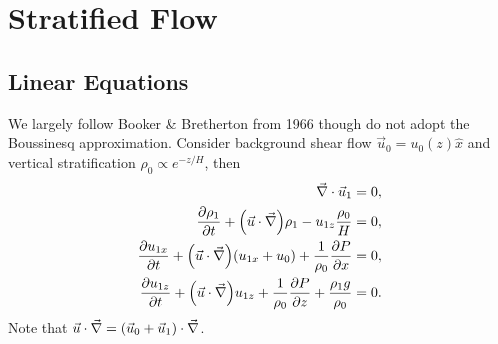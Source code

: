 \documentclass[11pt,
        usenames, %
        dvipsnames %
    ]{report}
\newcommand*{\pd}[2]{\frac{\partial#1}{\partial#2}}
\DeclarePairedDelimiter\p{\lparen}{\rparen}
\begin{document}
\chapter{Stratified Flow}

\section{Linear Equations}

We largely follow Booker \& Bretherton from 1966 though do not adopt the
Boussinesq approximation. Consider background shear flow $\vec{u}_0 =
u_0(z)\hat{x}$ and vertical stratification $\rho_0 \propto e^{-z/H}$, then
\begin{subequations}\label{se:shear_eq}
    \begin{align}
        \vec{\nabla} \cdot \vec{u}_1 &= 0,\\
        \pd{\rho_1}{t} + \p*{\vec{u} \cdot \vec{\nabla}}\rho_1
            - u_{1z}\frac{\rho_0}{H} &= 0,\\
        \pd{u_{1x}}{t} + \p*{\vec{u} \cdot \vec{\nabla}}\p*{u_{1x} + u_0}
            + \frac{1}{\rho_0}\pd{P}{x} &= 0,\\
        \pd{u_{1z}}{t} + \p*{\vec{u} \cdot \vec{\nabla}}u_{1z}
            + \frac{1}{\rho_0}\pd{P}{z} + \frac{\rho_1 g}{\rho_0} &= 0.
    \end{align}
\end{subequations}
Note that $\vec{u} \cdot \vec{\nabla} = \p*{\vec{u}_0 + \vec{u}_1} \cdot
\vec{\nabla}$.
\end{document}
